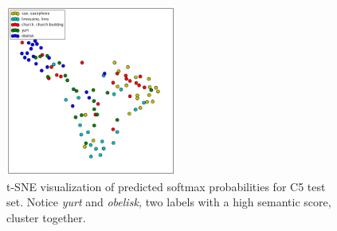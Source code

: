 



\begin{figure}[!tb]
  \centering
  \includegraphics[width=0.5\textwidth]{figs/tsne.png}
  \caption{
      t-SNE visualization of predicted softmax probabilities for C5 test set.
      Notice \emph{yurt} and \emph{obelisk,} two labels with a high semantic
      score, cluster together.
  }
  \label{fig:tsne}
\end{figure}

